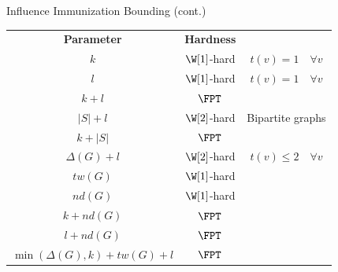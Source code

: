 \documentclass[10pt,aspectratio=169,english]{beamer}
\begin{document}
\begin{frame}{Influence Immunization Bounding (cont.)}
	\begin{center}
		\begin{tabular}{ c | c  c }
			\textbf{Parameter} & \textbf{Hardness} & \\
			$k$ & $\W[1]$-hard & $t(v)=1 \quad \forall v$ \\
			$l$ & $\W[1]$-hard & $t(v)=1 \quad \forall v$ \\
			$k+l$ & $\FPT$ &  \\
			$|S| + l$ & $\W[2]$-hard & Bipartite graphs \\
			$k+|S|$ & $\FPT$ & \\
			$\Delta(G) + l$ & $\W[2]$-hard & $t(v) \leq 2 \quad \forall v$ \\
			$tw(G)$ & $\W[1]$-hard & \\
			$nd(G)$ & $\W[1]$-hard & \\
			$k+nd(G)$ & $\FPT$ & \\
			$l+nd(G)$ & $\FPT$ & \\
			$\min(\Delta(G), k)+tw(G)+l$ & $\FPT$ & \\
		\end{tabular}
	\end{center}
	
	
	
\end{frame}
\end{document}
